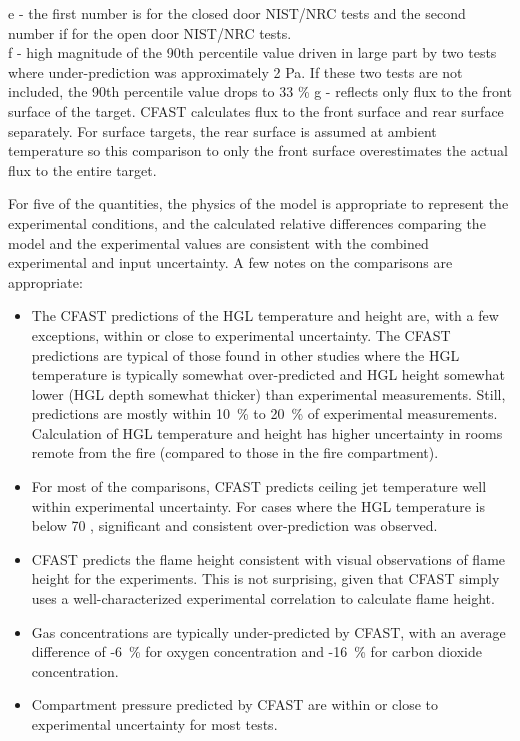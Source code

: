 \begin{table}
e - the first number is for the closed door NIST/NRC tests and the second number if for the open door NIST/NRC tests. \\
f - high magnitude of the 90th percentile value driven in large part by two tests where under-prediction was approximately 2 Pa. If these two tests are not included, the 90th percentile value drops to 33 \%
g - reflects only flux to the front surface of the target.  CFAST calculates flux to the front surface and rear surface separately.  For surface targets, the rear surface is assumed at ambient temperature so this comparison to only the front surface overestimates the actual flux to the entire target.
\end{table}

For five of the quantities,  the physics of the model is appropriate to represent the experimental conditions, and the calculated relative differences comparing the model and the experimental values are consistent with the combined experimental and input uncertainty.  A few notes on the comparisons are appropriate:

\begin{itemize}
\item The CFAST predictions of the HGL temperature and height are, with a few exceptions, within or close to experimental uncertainty.  The CFAST predictions are typical of those found in other studies where the HGL temperature is typically somewhat over-predicted and HGL height somewhat lower (HGL depth somewhat thicker) than experimental measurements.  Still, predictions are mostly within 10~\% to 20~\% of experimental measurements.  Calculation of HGL temperature and height has higher uncertainty in rooms remote from the fire (compared to those in the fire compartment).
\item For most of the comparisons, CFAST predicts ceiling jet temperature well within experimental uncertainty.  For cases where the HGL temperature is below 70 \degc, significant and consistent over-prediction was observed.
\item CFAST predicts the flame height consistent with visual observations of flame height for the experiments.  This is not surprising, given that CFAST simply uses a well-characterized experimental correlation to calculate flame height.
\item Gas concentrations are typically under-predicted by CFAST, with an average difference of -6~\% for oxygen concentration and -16~\% for carbon dioxide concentration. 
\item Compartment pressure predicted by CFAST are within or close to experimental uncertainty for most tests.
\end{itemize}


